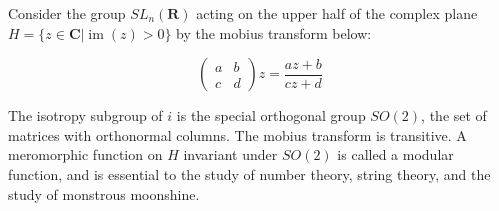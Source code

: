 \documentclass{report}
\DeclareMathOperator{\im}{im}
\begin{document}
Consider the group $SL_n(\mathbf{R})$ acting on the upper half of the complex plane $H = \{ z \in \mathbf{C} | \im(z) > 0 \}$ by the mobius transform below:

\[\begin{pmatrix} a & b \\ c & d \end{pmatrix} z = \frac{az + b}{cz + d}\]

The isotropy subgroup of $i$ is the special orthogonal group $SO(2)$, the set of matrices with orthonormal columns. The mobius transform is transitive. A meromorphic function on $H$ invariant under $SO(2)$ is called a modular function, and is essential to the study of number theory, string theory, and the study of monstrous moonshine.
\end{document}
